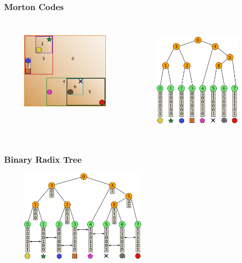\documentclass{beamer}
\begin{document}
\begin{frame}
  \frametitle{Morton Codes}
  
\begin{columns}[t]

\begin{figure}
\includegraphics[height=45mm]{primitive-box.png}
\end{figure}

\begin{figure}
\includegraphics[height=55mm]{radix_tree_bare.png}
\end{figure}
\end{columns}
\end{frame}

\begin{frame}
  \frametitle{Binary Radix Tree}
\begin{figure}
\includegraphics[height=45mm]{radix_tree.png}
\end{figure}
\end{frame}
\end{document}
